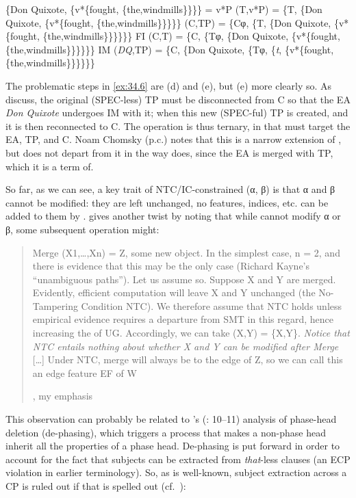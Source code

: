 \documentclass[output=paper]{langsci/langscibook}
\begin{document}
\ea%
    \label{ex:34.6}
	\ea \{Don Quixote, \{v*\{fought, \{the,windmills\}\}\}\} = v*P
	\ex {} (T,v*P) = \{T, \{Don Quixote, \{v*\{fought, \{the,windmills\}\}\}\}\}
	\ex {} (C,TP) = \{Cφ, \{T, \{Don Quixote, \{v*\{fought, \{the,windmills\}\}\}\}\}\}
	\ex \gls{FI} (C,T) = \{C, \{Tφ, \{Don Quixote, \{v*\{fought, \{the,windmills\}\}\}\}\}\}
    \ex \gls{IM} (\emph{DQ},TP) = \{C, \{Don Quixote, \{Tφ, \{\emph{t}, \{v*\{fought, \{the,windmills\}\}\}\}\}\}
	\z
\z

The problematic steps in \eqref{ex:34.6} are (d) and (e), but (e) more
clearly so. As \citet{EKS2012} discuss, the original (SPEC-less) TP must be
disconnected from C so that the \gls{EA} \emph{Don Quixote} undergoes \gls{IM}
with it; when this new (SPEC-ful) TP is created, and it is then reconnected to
C. The operation is thus ternary, in that  must target the \gls{EA}, TP,
and C.  Noam Chomsky (p.c.) notes that this is a narrow extension of , but
does not depart from it in the way  does, since the \gls{EA} is
merged with TP, which it is a term of.

So far, as we can see, a key trait of \gls{NTC}/\gls{IC}-constrained 
(α, β) is that α and β cannot be modified: they are left unchanged, no
features, indices, etc. can be added to them by .
\citet{Chomsky2007} gives another twist by noting that while  cannot
modify α or β, some subsequent operation might:

\blockquote[{\citealt[8]{Chomsky2007}, my emphasis}][.]{Merge
    (X1,\dots{},Xn) = Z, some new object. In the simplest case, n = 2, and
    there is evidence that this may be the only case (Richard Kayne’s
    “unambiguous paths”). Let us assume so. Suppose X and Y are merged.
    Evidently, efficient computation will leave X and Y unchanged (the
    No-Tampering Condition \gls{NTC}). We therefore assume that \gls{NTC} holds
    unless empirical evidence requires a departure from \gls{SMT} in this
    regard, hence increasing the  of \gls{UG}. Accordingly, we can
    take  (X,Y) = \{X,Y\}. \emph{Notice that \gls{NTC} entails nothing
    about whether X and Y can be modified after Merge} [\dots{}] Under \gls{NTC},
    merge will always be to the edge of Z, so we can call this an edge feature
    \gls{EF} of W}

This observation can probably be related to \citeauthor{Chomsky2015}’s
(\citeyear{Chomsky2015}: 10--11) analysis of phase-head deletion (de-phasing),
which triggers a process that makes a non-phase head inherit all the properties
of a phase head.  De-phasing is put forward in order to account for the fact
that subjects can be extracted from \emph{that}{}-less clauses (an \gls{ECP}
violation in earlier terminology). So, as is well-known, subject extraction
across a CP is ruled out if that is spelled out
(cf.~\citealt{Chomsky1986,Rizzi1990}):
\end{document}
